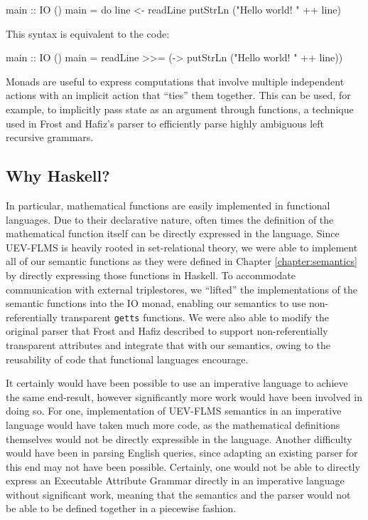 \documentclass[../main.tex]{subfiles}
\begin{document}
\begin{code}
main :: IO ()
main = do
	line <- readLine
	putStrLn ("Hello world! " ++ line)
\end{code}

This syntax is equivalent to the code:

\begin{code}
main :: IO ()
main = readLine >>= (\line -> putStrLn ("Hello world! " ++ line))
\end{code}

Monads are useful to express computations that involve multiple independent actions with an implicit 
action that ``ties'' them together.  This can be used, for example, to implicitly pass state as an argument through
functions, a technique used in Frost and Hafiz's parser to efficiently parse highly ambiguous left recursive grammars\cite{frosthafiz2008}.

\subsection{Why Haskell?}

In particular, mathematical functions are easily implemented in functional languages.  Due to their declarative nature,
often times the definition of the mathematical function itself can be directly expressed in the language.  Since UEV-FLMS
is heavily rooted in set-relational theory\cite{frost1989constructing}, we were able to implement all of our semantic functions as they were defined in Chapter \ref{chapter:semantics} by directly expressing those functions in Haskell.  To accommodate communication with external triplestores, we ``lifted'' the implementations of the semantic functions into the IO monad, enabling our semantics to use non-referentially transparent \texttt{getts} functions.  We were also able to modify the original parser that Frost and Hafiz described\cite{frosthafiz2008} to support non-referentially transparent attributes and integrate that with our semantics, owing to the reusability of code that functional languages encourage.

It certainly would have been possible to use an imperative language to achieve the same end-result, however significantly more work would have been involved in doing so.  For one, implementation of UEV-FLMS semantics in an imperative language would have taken much more code, as the mathematical definitions themselves would not be directly expressible in the language. Another difficulty would have been in parsing English queries, since adapting an existing parser for this end may not have been possible.  Certainly, one would not be able to directly express an Executable Attribute Grammar directly in an imperative language without significant work, meaning that the semantics and the parser would not be able to be defined together in a piecewise fashion.
\end{document}
